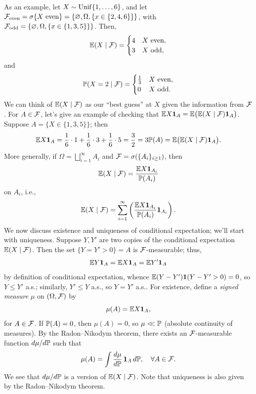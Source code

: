 As an example, let $X \sim \operatorname{Unif}\{1, \dots, 6\}$, and let $\mathcal F_{\text{even}} = \sigma\{X \text{ even}\} = \{\varnothing, \Omega, \{x \in \{2, 4, 6\}\}\}$, with \\
$\mathcal F_{\text{odd}} = \{\varnothing, \Omega, \{x \in \{1, 3, 5\}\}\}$.
Then,
\[ \mathbb E(X \mid \mathcal F) = \begin{cases} 4 & \text{$X$ even}, \\ 3 & \text{$X$ odd}, \end{cases} \]
and
\[ \mathbb P(X = 2 \mid \mathcal F) = \begin{cases} \frac{1}{3} & \text{$X$ even}, \\ 0 & \text{$X$ odd}. \end{cases} \]
We can think of $\mathbb E(X \mid \mathcal F)$ as our ``best guess'' at $X$ given the information from $\mathcal F$. For $A \in \mathcal F$, let's give an example of checking that $\mathbb E X \mathbf 1_A = \mathbb E\bigl(\mathbb E (X \mid \mathcal F) \mathbf 1_A\bigr)$. Suppose $A = \{X \in \{1, 3, 5\}\}$; then
\[ \mathbb E X \mathbf 1_A = \frac{1}{6} \cdot 1 + \frac{1}{6} \cdot 3 + \frac{1}{6} \cdot 5 = \frac{3}{2} = 3 \mathbb P(A) = \mathbb E\bigl(\mathbb E (X \mid \mathcal F) \mathbf 1_A\bigr). \]
More generally, if $\Omega = \bigsqcup_{i=1}^\infty A_i$ and $\mathcal F = \sigma(\{A_i\}_{i \geq 1})$, then
\[ \mathbb E(X \mid \mathcal F) = \frac{\mathbb E X \mathbf 1_{A_i}}{\mathbb P(A_i)} \]
on $A_i$, i.e.,
\[ \mathbb E(X \mid \mathcal F) = \sum_{i=1}^\infty \left(\frac{\mathbb E X \mathbf 1_{A_i}}{\mathbb P(A_i)} \mathbf 1_{A_i}\right). \]
We now discuss existence and uniqueness of conditional expectation; we'll start with uniqueness. Suppose $Y, Y'$ are two copies of the conditional expectation $\mathbb E(X \mid \mathcal F)$. Then the set $\{Y = Y' > 0\} = A$ is $\mathcal F$-measurable; thus,
\[ \mathbb E Y \mathbf 1_A = \mathbb E X \mathbf 1_A = \mathbb E Y' \mathbf 1_A \]
by definition of conditional expectation, whence $\mathbb E(Y - Y') \mathbf 1(Y - Y' > 0) = 0$, so $Y \leq Y'$ a.s.; similarly, $Y' \leq Y$ a.s., so $Y = Y'$ a.s.. For existence, define a \textit{signed measure} $\mu$ on $(\Omega, \mathcal F)$ by
\[ \mu(A) =\mathbb E X \mathbf 1_A, \]
for $A \in \mathcal F$. If $\mathbb P(A) = 0$, then $\mu(A) = 0$, so $\mu <\!\!< \mathbb P$ (absolute continuity of measures). By the Radon--Nikodym theorem, there exists an $\mathcal F$-measurable function $d\mu/d\mathbb P$ such that
\[ \mu(A) = \int \frac{d\mu}{d\mathbb P} \, \mathbf 1_A \, d\mathbb P, \quad \forall A \in \mathcal F. \]
We see that $d\mu/d\mathbb P$ is a version of $\mathbb E(X \mid \mathcal F)$. Note that uniqueness is also given by the Radon--Nikodym theorem.

